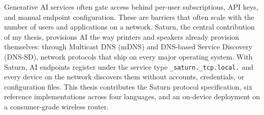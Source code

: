 Generative AI services often gate access behind per-user subscriptions, API keys, and manual endpoint configuration. These are barriers that often scale with the number of users and applications on a network.
Saturn, the central contribution of my thesis, provisions AI the way printers and speakers already provision themselves: through Multicast DNS (mDNS) and DNS-based Service Discovery (DNS-SD), network protocols that ship on every major operating system. With Saturn, AI endpoints register under the service type \texttt{\_saturn.\_tcp.local.} and every device on the network discovers them without accounts, credentials, or configuration files.
This thesis contributes the Saturn protocol specification, six reference implementations across four languages, and an on-device deployment on a consumer-grade wireless router. 